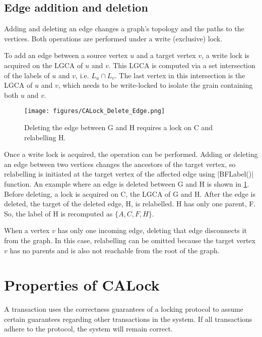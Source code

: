 \subsection{Edge addition and deletion}
Adding and deleting an edge changes a graph's topology and the paths to the vertices. 
Both operations are performed under a write (exclusive) lock. 

To add an edge between a source vertex $u$ and a target vertex $v$, a write lock is acquired on the LGCA of $u$ and $v$. This LGCA is computed via a set intersection of the labels of $u$ and $v$, i.e. $L_u \cap L_v$. The last vertex in this intersection is the LGCA of $u$ and $v$, which needs to be write-locked to isolate the grain containing both $u$ and $v$.

\begin{figure}[h]
	\centering
	\captionsetup{justification=centering}
	\texttt{[image: figures/CALock\_Delete\_Edge.png]}
	\caption{Deleting the edge between G and H requires a lock on C and relabelling H.}
	\label{fig:calockedgedeletion}
\end{figure}

Once a write lock is acquired, the operation can be performed. Adding or deleting an edge between two vertices changes the ancestors of the target vertex, so relabelling is initiated at the target vertex of the affected edge using \inline|BFLabel()| function. An example where an edge is deleted between G and H  is shown in \cref{fig:calockedgedeletion}. Before deleting, a lock is acquired on C, the LGCA of G and H. After the edge is deleted, the target of the deleted edge, H, is relabelled. H has only one parent, F. So, the label of H is recomputed as $\{A, C, F, H\}$.

When a vertex $v$ has only one incoming edge, deleting that edge disconnects it from the graph. 
In this case, relabelling can be omitted because the target vertex $v$ has no parents and is also not reachable from the root of the graph. 

\section{Properties of CALock} \label{chap:formalProperties}


A transaction uses the correctness guarantees of a locking protocol to assume certain guarantees regarding other transactions in the system. If all transactions adhere to the protocol, the system will remain correct.

